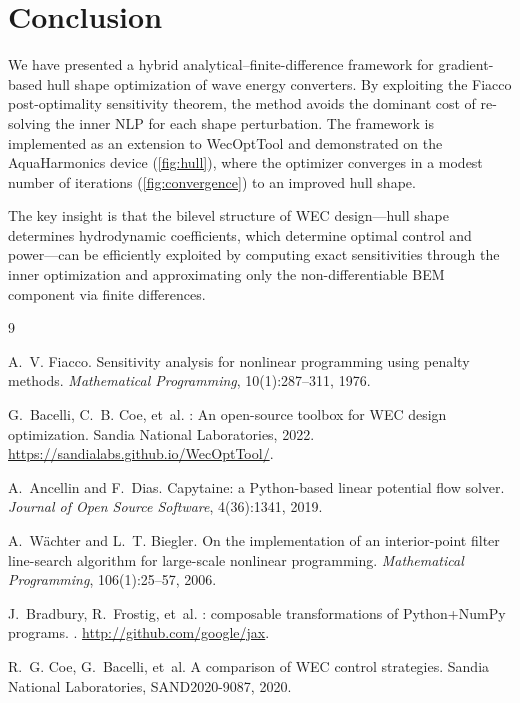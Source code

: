 \documentclass[11pt,a4paper]{article}
\begin{document}
\section{Conclusion}
\label{sec:conclusion}

We have presented a hybrid analytical--finite-difference framework for
gradient-based hull shape optimization of wave energy converters.  By
exploiting the Fiacco post-optimality sensitivity theorem, the method
avoids the dominant cost of re-solving the inner NLP for each shape
perturbation.  The framework is implemented as an extension to
WecOptTool and demonstrated on the AquaHarmonics device
(\cref{fig:hull}), where the optimizer converges in a modest number
of iterations (\cref{fig:convergence}) to an improved hull shape.

The key insight is that the bilevel structure of WEC design---hull
shape determines hydrodynamic coefficients, which determine optimal
control and power---can be efficiently exploited by computing exact
sensitivities through the inner optimization and approximating only
the non-differentiable BEM component via finite differences.



\begin{thebibliography}{9}

A.~V. Fiacco.
\newblock Sensitivity analysis for nonlinear programming using penalty methods.
\newblock \emph{Mathematical Programming}, 10(1):287--311, 1976.

G.~Bacelli, C.~B. Coe, et~al.
: An open-source toolbox for WEC design optimization.
\newblock Sandia National Laboratories, 2022.
\newblock \url{https://sandialabs.github.io/WecOptTool/}.

A.~Ancellin and F.~Dias.
\newblock Capytaine: a {P}ython-based linear potential flow solver.
\newblock \emph{Journal of Open Source Software}, 4(36):1341, 2019.

A.~W{\"a}chter and L.~T. Biegler.
\newblock On the implementation of an interior-point filter line-search
  algorithm for large-scale nonlinear programming.
\newblock \emph{Mathematical Programming}, 106(1):25--57, 2006.

J.~Bradbury, R.~Frostig, et~al.
: composable transformations of {P}ython+{N}um{P}y programs.
.
\newblock \url{http://github.com/google/jax}.

R.~G. Coe, G.~Bacelli, et~al.
\newblock A comparison of {WEC} control strategies.
\newblock Sandia National Laboratories, SAND2020-9087, 2020.

\end{thebibliography}
\end{document}
